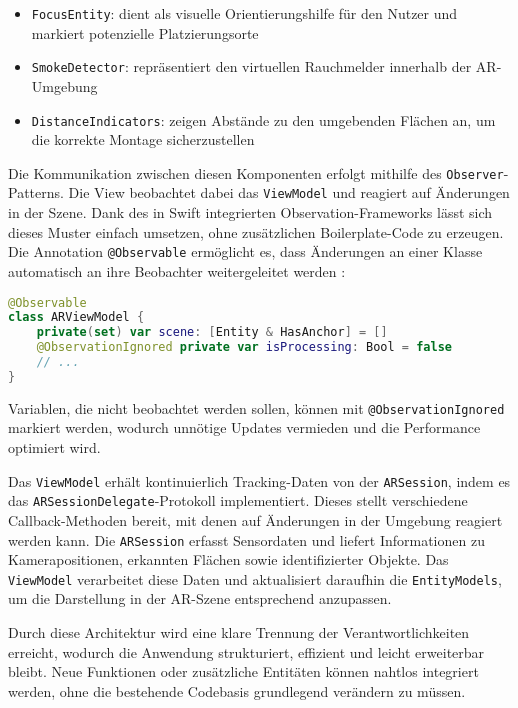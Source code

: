 \begin{itemize}
    \item \texttt{FocusEntity}: dient als visuelle Orientierungshilfe für den Nutzer und markiert potenzielle Platzierungsorte
    \item \texttt{SmokeDetector}: repräsentiert den virtuellen Rauchmelder innerhalb der AR-Umgebung
    \item \texttt{DistanceIndicators}: zeigen Abstände zu den umgebenden Flächen an, um die korrekte Montage sicherzustellen
\end{itemize}

Die Kommunikation zwischen diesen Komponenten erfolgt mithilfe des \texttt{Observer}-Patterns. Die View beobachtet dabei das \texttt{ViewModel} und reagiert auf Änderungen in der Szene. Dank des in Swift integrierten Observation-Frameworks lässt sich dieses Muster einfach umsetzen, ohne zusätzlichen Boilerplate-Code zu erzeugen. Die Annotation \texttt{@Observable} ermöglicht es, dass Änderungen an einer Klasse automatisch an ihre Beobachter weitergeleitet werden \cite{appledevdoc}:

\begin{lstlisting}[language=Swift]
@Observable
class ARViewModel {
    private(set) var scene: [Entity & HasAnchor] = []
    @ObservationIgnored private var isProcessing: Bool = false
    // ...
}
\end{lstlisting}

Variablen, die nicht beobachtet werden sollen, können mit \texttt{@ObservationIgnored} markiert werden, wodurch unnötige Updates vermieden und die Performance optimiert wird. \cite{appledevdoc}

Das \texttt{ViewModel} erhält kontinuierlich Tracking-Daten von der \texttt{ARSession}, indem es das \texttt{ARSessionDelegate}-Protokoll implementiert. Dieses stellt verschiedene Callback-Methoden bereit, mit denen auf Änderungen in der Umgebung reagiert werden kann. Die \texttt{ARSession} erfasst Sensordaten und liefert Informationen zu Kamerapositionen, erkannten Flächen sowie identifizierter Objekte. Das \texttt{ViewModel} verarbeitet diese Daten und aktualisiert daraufhin die \texttt{EntityModels}, um die Darstellung in der AR-Szene entsprechend anzupassen.

Durch diese Architektur wird eine klare Trennung der Verantwortlichkeiten erreicht, wodurch die Anwendung strukturiert, effizient und leicht erweiterbar bleibt. Neue Funktionen oder zusätzliche Entitäten können nahtlos integriert werden, ohne die bestehende Codebasis grundlegend verändern zu müssen.

